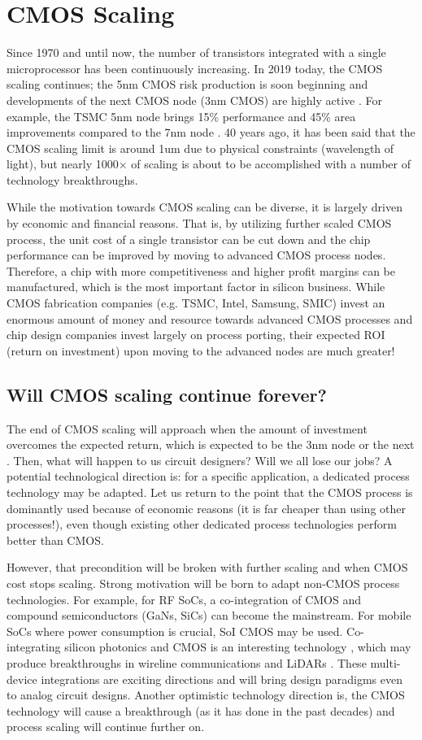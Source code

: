 \section{CMOS Scaling}
Since 1970 and until now, the number of transistors integrated with a single microprocessor has been continuously increasing.
In 2019 today, the CMOS scaling continues; the 5nm CMOS risk production is soon beginning and developments of the next CMOS node (3nm CMOS) are highly active \cite{3nm_imec}. For example, the TSMC 5nm node brings 15\% performance and 45\% area improvements compared to the 7nm node \cite{tsmc5nm}. 40 years ago, it has been said that the CMOS scaling limit is around 1um due to physical constraints (wavelength of light), but nearly 1000$\times$ of scaling is about to be accomplished with a number of technology breakthroughs.

While the motivation towards CMOS scaling can be diverse, it is largely driven by economic and financial reasons. 
That is, by utilizing further scaled CMOS process, the unit cost of a single transistor can be cut down and the chip performance can be improved by moving to advanced CMOS process nodes. Therefore, a chip with more competitiveness and higher profit margins can be manufactured, which is the most important factor in silicon business.
While CMOS fabrication companies (e.g. TSMC, Intel, Samsung, SMIC) invest an enormous amount of money and resource towards advanced CMOS processes and chip design companies invest largely on process porting, their expected ROI (return on investment) upon moving to the advanced nodes are much greater!

\subsection{Will CMOS scaling continue forever?}
The end of CMOS scaling will approach when the amount of investment overcomes the expected return, which is expected to be the 3nm node or the next \cite{itrs}. Then, what will happen to us circuit designers? Will we all lose our jobs?
A potential technological direction is: for a specific application, a dedicated process technology may be adapted. Let us return to the point that the CMOS process is dominantly used because of economic reasons (it is far cheaper than using other processes!), even though existing other dedicated process technologies perform better than CMOS.

However, that precondition will be broken with further scaling and when CMOS cost stops scaling. Strong motivation will be born to adapt non-CMOS process technologies. For example, for RF SoCs, a co-integration of CMOS and compound semiconductors (GaNs, SiCs) can become the mainstream. For mobile SoCs where power consumption is crucial, SoI CMOS may be used. Co-integrating silicon photonics and CMOS is an interesting technology \cite{issccphotonics1}, which may produce breakthroughs in wireline communications\cite{photonics1} and LiDARs \cite{photonics2}. 
These multi-device integrations are exciting directions and will bring design paradigms even to analog circuit designs.
Another optimistic technology direction is, the CMOS technology will cause a breakthrough (as it has done in the past decades) and process scaling will continue further on.

